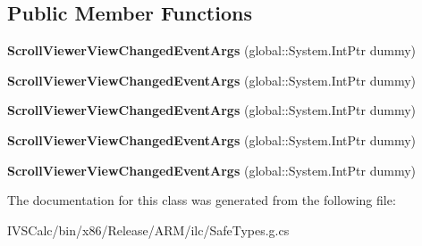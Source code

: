 \subsection*{Public Member Functions}
\begin{DoxyCompactItemize}
\item 
\mbox{\label{class_windows_1_1_u_i_1_1_xaml_1_1_controls_1_1_scroll_viewer_view_changed_event_args_a411142a071bfc02e6afc27da6fd883d8}} 
{\bfseries Scroll\+Viewer\+View\+Changed\+Event\+Args} (global\+::\+System.\+Int\+Ptr dummy)
\item 
\mbox{\label{class_windows_1_1_u_i_1_1_xaml_1_1_controls_1_1_scroll_viewer_view_changed_event_args_a411142a071bfc02e6afc27da6fd883d8}} 
{\bfseries Scroll\+Viewer\+View\+Changed\+Event\+Args} (global\+::\+System.\+Int\+Ptr dummy)
\item 
\mbox{\label{class_windows_1_1_u_i_1_1_xaml_1_1_controls_1_1_scroll_viewer_view_changed_event_args_a411142a071bfc02e6afc27da6fd883d8}} 
{\bfseries Scroll\+Viewer\+View\+Changed\+Event\+Args} (global\+::\+System.\+Int\+Ptr dummy)
\item 
\mbox{\label{class_windows_1_1_u_i_1_1_xaml_1_1_controls_1_1_scroll_viewer_view_changed_event_args_a411142a071bfc02e6afc27da6fd883d8}} 
{\bfseries Scroll\+Viewer\+View\+Changed\+Event\+Args} (global\+::\+System.\+Int\+Ptr dummy)
\item 
\mbox{\label{class_windows_1_1_u_i_1_1_xaml_1_1_controls_1_1_scroll_viewer_view_changed_event_args_a411142a071bfc02e6afc27da6fd883d8}} 
{\bfseries Scroll\+Viewer\+View\+Changed\+Event\+Args} (global\+::\+System.\+Int\+Ptr dummy)
\end{DoxyCompactItemize}


The documentation for this class was generated from the following file\+:\begin{DoxyCompactItemize}
\item 
I\+V\+S\+Calc/bin/x86/\+Release/\+A\+R\+M/ilc/Safe\+Types.\+g.\+cs\end{DoxyCompactItemize}
